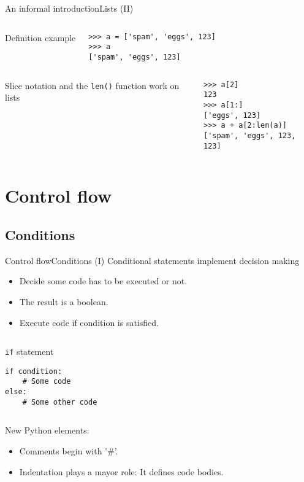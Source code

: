 \documentclass[10pt,compress]{beamer} %
\begin{document}
\begin{frame}[fragile]{An informal introduction}{Lists (II)}
	\begin{columns}
		Definition example

		\begin{block}{}
		\begin{verbatim}
>>> a = ['spam', 'eggs', 123]
>>> a
['spam', 'eggs', 123]
\end{verbatim}
		\end{block}
	\end{columns}

	\begin{columns}
 	   	\column{.40\textwidth}
		Slice notation and the \texttt{len()} function work on lists

   		\column{.60\textwidth}
		\begin{block}{}
		\begin{verbatim}
>>> a[2]
123
>>> a[1:]
['eggs', 123]
>>> a + a[2:len(a)]
['spam', 'eggs', 123, 123]
\end{verbatim}
		\end{block}
	\end{columns}
\end{frame}

\section{Control flow}
\subsection{Conditions}

\begin{frame}[fragile]{Control flow}{Conditions (I)}
	Conditional statements implement decision making
	\begin{itemize}
	\item Decide some code has to be executed or not.
	\item The result is a boolean.
	\item Execute code if condition is satisfied.
	\end{itemize}

	\begin{columns}
	\begin{block}{\texttt{if} statement}
		\begin{verbatim}
if condition:
    # Some code
else:
    # Some other code
\end{verbatim}
		\end{block}
	\end{columns}

   New Python elements:
	\begin{itemize}
	\item Comments begin with '\#'.
	\item \alert{Indentation plays a mayor role: It defines code bodies.}
	\end{itemize}
	
\end{frame}
\end{document}
